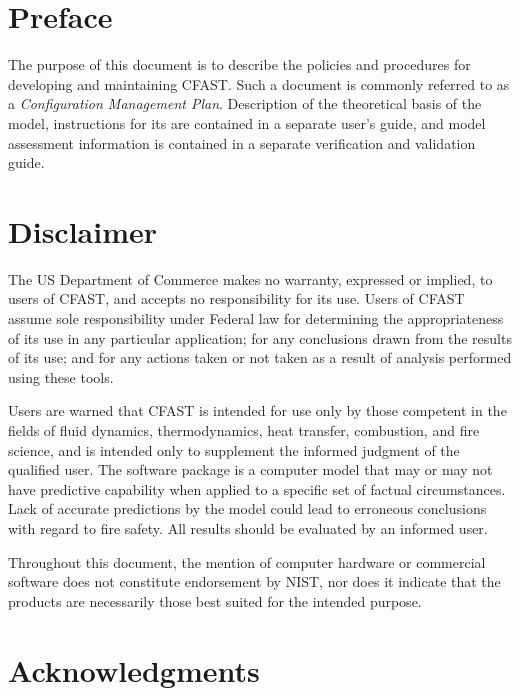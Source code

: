 \documentclass[12pt]{book}
\begin{document}
\newpage

\frontmatter

\pagestyle{plain}
\setcounter{page}{3}


\chapter{Preface}

The purpose of this document is to describe the policies and procedures for developing and maintaining CFAST. Such a document is commonly referred to as a {\em Configuration Management Plan}. Description of the theoretical basis of the model, instructions for its are contained in a separate user's guide, and model assessment information is contained in a separate verification and validation guide.

\chapter{Disclaimer}

The US Department of Commerce makes no warranty, expressed or implied, to users of CFAST, and accepts no responsibility for its use. Users of CFAST assume sole responsibility under Federal law for determining the appropriateness of its use in any particular application; for any conclusions drawn from the results of its use; and for any actions taken or not taken as a result of analysis performed using these tools.

Users are warned that CFAST is intended for use only by those competent in the fields of fluid dynamics, thermodynamics, heat transfer, combustion, and fire science, and is intended only to supplement the informed judgment of the qualified user. The software package is a computer model that may or may not have predictive capability when applied to a specific set of factual circumstances. Lack of accurate predictions by the model could lead to erroneous conclusions with regard to fire safety. All results should be evaluated by an informed user.

Throughout this document, the mention of computer hardware or commercial software does not constitute endorsement by NIST, nor does it indicate that the products are necessarily those best suited for the intended purpose.




\chapter{Acknowledgments}
\end{document}
